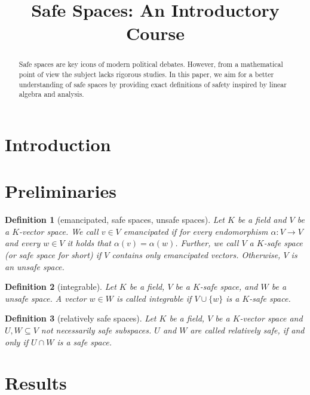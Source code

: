 \documentclass[]{article}
\newtheorem{definition}{Definition}
\begin{document}
\title{Safe Spaces: An Introductory Course}

\maketitle 

\begin{abstract}
Safe spaces are key icons of modern political debates. However, from a mathematical point of view the subject lacks rigorous studies. In this paper, we aim for a better understanding of safe spaces by providing exact definitions of safety inspired by linear algebra and analysis. 
\end{abstract}

\section{Introduction}



\section{Preliminaries}

\begin{definition}[emancipated, safe spaces, unsafe spaces]
	Let $K$ be a field and $V$ be a $K$-vector space. We call $v \in V$ \emph{emancipated} if for every endomorphism $\alpha: V \to V$ and every $w \in V$ it holds that $\alpha(v) = \alpha(w)$. Further, we call $V$ a \emph{$K$-safe space} (or \emph{safe space} for short) if $V$ contains only emancipated vectors. Otherwise, $V$ is an \emph{unsafe space}.
\end{definition}


\begin{definition}[integrable]
	Let $K$ be a field, $V$ be a $K$-safe space, and $W$ be a unsafe space.
	A vector $w \in W$ is called \emph{integrable} if $V \cup \{w\}$ is a $K$-safe space.
\end{definition}

\begin{definition}[relatively safe spaces]
    Let $K$ be a field, $V$ be a $K$-vector space and $U, W \subseteq V $ not
    necessarily safe subspaces. $U$ and $W$ are called \emph{relatively safe}, if
    and only if $U \cap W$ is a safe space.
\end{definition}

\section{Results}
\end{document}
